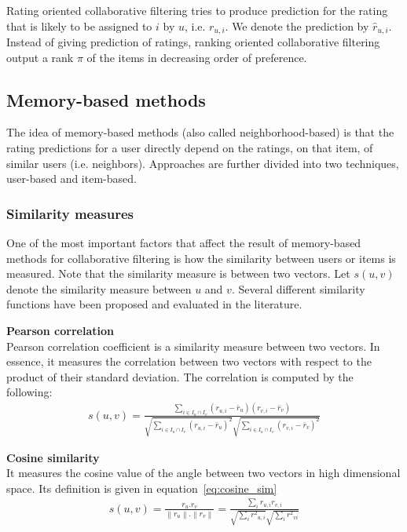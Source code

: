 \documentclass[oneside,13pt]{extreport}
\begin{document}
Rating oriented collaborative filtering tries to produce prediction for the rating that is likely to be assigned to $i$ by $u$, i.e. $r_{u,i}$. We denote the prediction by $\hat r_{u,i}$. Instead of giving prediction of ratings, ranking oriented collaborative
filtering output a rank $\pi$ of the items in decreasing order
of preference.
\subsection{Memory-based methods}
The idea of memory-based methods (also called neighborhood-based) is that the rating predictions for a user directly depend on the ratings, on that item, of similar users (i.e. neighbors).  Approaches are further divided into two techniques, user-based and item-based.

\subsubsection{Similarity measures}
One of the most important factors that affect the result of memory-based methods for collaborative filtering is how the similarity between
users or items is measured. Note that the similarity measure is between two vectors. Let $s(u,v)$ denote the similarity measure between $u$ and $v$. Several different similarity functions have been proposed and evaluated in the literature.

\begin{description}
    \item{\textbf{Pearson correlation}} 
    \\Pearson correlation coefficient is a similarity measure between two vectors. In essence, it measures the correlation between two vectors with respect to the product of their standard deviation. The correlation is computed by the following:
    \begin{eqnarray}
	\label{eq:pearson_sim}
	s\left( {u,v} \right) = \frac{{\sum\nolimits_{i \in {I_u} \cap {I_v}} {({r_{u,i}} - \bar r_u )({r_{v,i}} - \bar r_v )} }}{{\sqrt {\sum\nolimits_{i \in {I_u} \cap {I_v}} {{{({r_{u,i}} - \bar r_u )}^2}} } \sqrt {\sum\nolimits_{i \in {I_u} \cap {I_v}} {{{({r_{v,i}} - \bar r_v )}^2}} } }}
	\end{eqnarray} 
    \item{\textbf{Cosine similarity}} 
    \\It measures the cosine value of the angle between two vectors in high dimensional space. Its definition is given in equation~\ref{eq:cosine_sim}
    \begin{eqnarray}
	\label{eq:cosine_sim}
	s\left( {u,v} \right) = \frac{{{r_u}.{r_v}}}{{\left\| {{r_u}} \right\|.\left\| {{r_v}} \right\|}} = \frac{{\sum\nolimits_i {{r_{u,i}}{r_{v,i}}} }}{{\sqrt {\sum\nolimits_i {{r^2}_{u,i}} } \sqrt {\sum\nolimits_i {{r^2}_{vi}} } }}
	\end{eqnarray}
	
\end{description}
  
\end{document}
